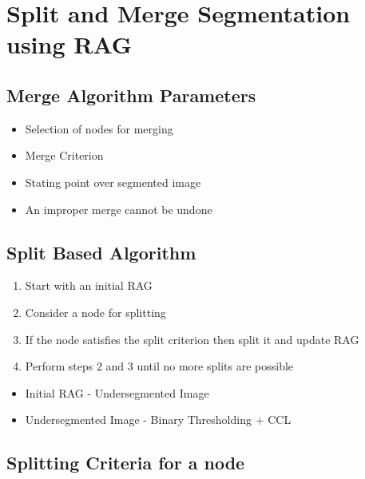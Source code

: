 \documentclass[11pt]{article}
\theoremstyle{definition}
\begin{document}
\newpage
\section{Split and Merge Segmentation using RAG}


\subsection*{Merge Algorithm Parameters}

\begin{itemize}
    \item Selection of nodes for merging
    \item Merge Criterion
    \item Stating point over segmented image
    \item An improper merge cannot be undone
\end{itemize}


\subsection*{Split Based Algorithm}

\begin{enumerate}
    \item Start with an initial RAG
    \item Consider a node for splitting
    \item If the node satisfies the split criterion then split it and update RAG
    \item Perform steps 2 and 3 until no more splits are possible
\end{enumerate}

\begin{itemize}
    \item Initial RAG - Undersegmented Image
    \item Undersegmented Image - Binary Thresholding + CCL
\end{itemize}


\subsection*{Splitting Criteria for a node}
\end{document}
